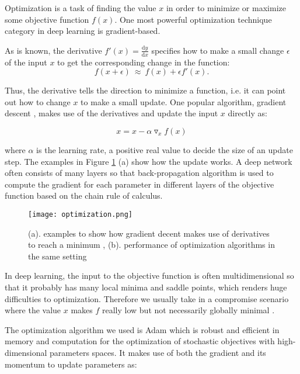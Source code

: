 Optimization is a task of finding the value $x$ in order to minimize or maximize some objective function $f(x)$. One most powerful optimization technique category in deep learning is gradient-based.

As is known, the derivative $f'(x)=\frac{\text{d}y}{\text{d}x}$ specifies how to make a small change $\epsilon$ of the input $x$ to get the corresponding change in the function:
\begin{equation}
	f(x + \epsilon)~ \approx ~ f(x) + \epsilon f'(x).
\end{equation}

Thus, the derivative tells the direction to minimize a function, i.e. it can point out how to change $x$ to make a small update. One popular algorithm, gradient descent \cite{gd1847}, makes use of the derivatives and update the input $x$ directly as:

\begin{equation}
x = x - \alpha {\triangledown} _x f(x)
\end{equation}

where $\alpha$ is the learning rate, a positive real value to decide the size of an update step. The examples in Figure \ref{figure:optimization} (a) show how the update works.  A deep network often consists of many layers so that back-propagation algorithm \cite{Rumelhart:1988:LRB:65669.104451} is used to compute the gradient for each parameter in different layers of the objective function based on the chain rule of calculus.

\begin{figure}[h]		
	\texttt{[image: optimization.png]}
	\caption{(a). examples to show how gradient decent makes use of derivatives to reach a minimum \cite{Goodfellow-et-al-2016}, (b). performance of optimization algorithms in the same setting \cite{DBLP:journals/corr/KingmaB14}}
	\centering
	\label{figure:optimization}
\end{figure}

In deep learning, the input to the objective function is often multidimensional so that it probably has many local minima and saddle points, which renders huge difficulties to optimization. Therefore we usually take in a compromise scenario where the value $x$ makes $f$ really low but not necessarily globally minimal \cite{Goodfellow-et-al-2016}.

The optimization algorithm we used is Adam \cite{DBLP:journals/corr/KingmaB14} which is robust and efficient in memory and computation for the optimization of stochastic objectives with high-dimensional parameters spaces. It makes use of both the gradient and its momentum to update parameters as: 

